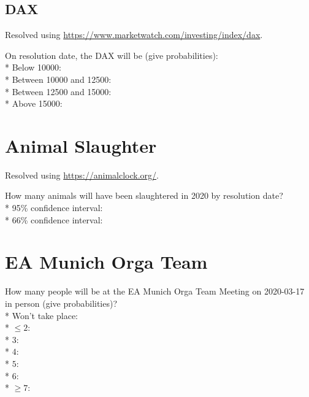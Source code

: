 \documentclass{article}
\begin{document}
\subsection*{DAX}

Resolved using
\href{https://www.marketwatch.com/investing/index/dax}{https://www.marketwatch.com/investing/index/dax}.

\vspace{0.5cm}

On resolution date, the DAX will be (give probabilities):\\*
Below 10000: \null\hfill\underline{\hspace{5cm}}\\*
Between 10000 and 12500: \null\hfill\underline{\hspace{5cm}}\\*
Between 12500 and 15000: \null\hfill\underline{\hspace{5cm}}\\*
Above 15000: \null\hfill\underline{\hspace{5cm}}

\section*{Animal Slaughter}

Resolved using \href{https://animalclock.org/}{https://animalclock.org/}.

\vspace{0.5cm}

How many animals will have been slaughtered in 2020 by resolution date?\\*
95\% confidence interval: \null\hfill\underline{\hspace{8cm}}\\*
66\% confidence interval: \null\hfill\underline{\hspace{8cm}}

\section*{EA Munich Orga Team}

How many people will be at the EA Munich Orga Team Meeting on 2020-03-17
in person (give probabilities)?\\*
Won't take place: \null\hfill\underline{\hspace{5cm}}\\*
$\le 2$: \null\hfill\underline{\hspace{5cm}}\\*
$3$: \null\hfill\underline{\hspace{5cm}}\\*
$4$: \null\hfill\underline{\hspace{5cm}}\\*
$5$: \null\hfill\underline{\hspace{5cm}}\\*
$6$: \null\hfill\underline{\hspace{5cm}}\\*
$\ge 7$: \null\hfill\underline{\hspace{5cm}}
\end{document}
